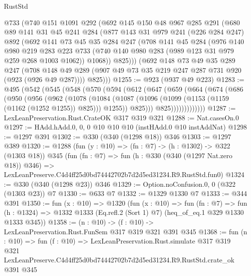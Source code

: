 \begin{lexlean}{RustStd}
\begin{coremodule}
    @733
    (@740
      @151
      @1091
      @292
      (@692
        @145
        @150
        @48
        @967
        @285
        @291
        (@680
          @89
          @141
          @31
          @45
          @241
          @284
          (@877
            @143
            @31
            @979
            @241
            (@226 @284 @247)
            @892
            (@692
              @141
              @73
              @45
              @35
              @284
              @247
              (@708
                @141
                @45
                @284
                (@976
                  @140
                  @980
                  @219
                  @283
                  @223
                  @733
                  (@740 @140 @980 @283 (@989 @123 @31 @979 @259 @268 @1003 @1062))
                  @1068))
              @825)))
        (@692
          @148
          @73
          @49
          @35
          @289
          @247
          (@708 @148 @49 @289 (@907 @49 @73 @35 @219 @247 @287 @731 @920 (@923 (@926 @49 @287))))
          @825)))
@1255 := @923 (@937 @49 @223)
@1283 := @495
    (@542
      (@545
        (@548
          (@570
            (@594
              (@612
                (@647
                  (@659
                    (@664
                      (@674
                        (@686
                          (@950
                            (@956
                              (@962
                                (@1078
                                  (@1084
                                    (@1087
                                      (@1096
                                        (@1099 (@1153 (@1159 (@1162 (@1252 @1255)) @825)))
                                        @1255))
                                    @825)))
                              @825)))))))))))))
@1287 := LexLeanPreservation.Rust.CrateOK @317 @319 @321
@1288 := Nat.casesOn.{0}
@1297 := HAdd.hAdd.{0, 0, 0} @10 @10 @10 (instHAdd.{0} @10 instAddNat)
@1298 := @1297 @391
@1302 := @330 (@340 (@1298 @18)) @346
@1303 := @1297 @389
@1320 := @1288
    (fun (y : @10) => (fn : @7) -> (h : @1302) -> @322 (@1303 @18))
    @345
    (fun (fn : @7) =>
    fun (h : @330 (@340 (@1297 Nat.zero @18)) @346) =>
    LexLeanPreserve.C4d4ff25d0bd74442702b7d2d5ed31234.R9.RustStd.fun0)
@1324 := @330 (@340 (@1298 @23)) @346
@1329 := Option.noConfusion.{0, 0} (@322 (@1303 @23)) @7
@1330 := @633 @7
@1332 := @1329 @1330 @7
@1333 := @344 @391
@1350 := fun (x : @10) =>
  @1320
    (fun (x : @10) =>
    fun (fn : @7) =>
    fun (h : @1324) => @1332 @1333 (Eq.refl.{2} (Sort 1) @7) (heq_of_eq.{1} @329 @1330 @1333 @345))
@1358 := (n : @10) -> (f : @10) -> LexLeanPreservation.Rust.FunSem @317 @319 @321 @391 @345
@1368 := fun (n : @10) =>
  fun (f : @10) =>
  LexLeanPreservation.Rust.simulate
    @317
    @319
    @321
    LexLeanPreserve.C4d4ff25d0bd74442702b7d2d5ed31234.R9.RustStd.crate_ok
    @391
    @345
\end{coremodule}
\end{lexlean}
